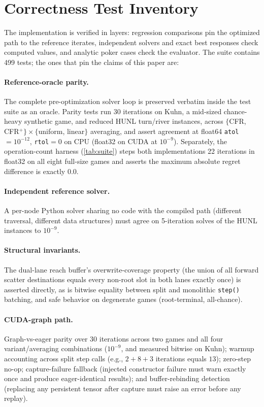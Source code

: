 \section{Correctness Test Inventory}
\label{app:correctness}

The implementation is verified in layers: regression comparisons pin the optimized
path to the reference iterates, independent solvers and exact best responses check
computed values, and analytic poker cases check the evaluator. The suite contains
499 tests; the ones that pin the claims of this paper are:

\paragraph{Reference-oracle parity.}
The complete pre-optimization solver loop is preserved verbatim inside the test suite
as an oracle. Parity tests run 30 iterations on Kuhn, a mid-sized chance-heavy
synthetic game, and reduced HUNL turn/river instances, across
$\{$CFR, CFR$^{+}\} \times \{$uniform, linear$\}$ averaging, and assert agreement at
float64 \texttt{atol}$=10^{-12}$, \texttt{rtol}$=0$ on CPU (float32 on CUDA at
$10^{-9}$). Separately, the operation-count harness (\cref{tab:suite}) steps both
implementations 22 iterations in float32 on all eight full-size games and asserts the
maximum absolute regret difference is exactly $0.0$.

\paragraph{Independent reference solver.}
A per-node Python solver sharing no code with the compiled path (different traversal,
different data structures) must agree on 5-iteration solves of the HUNL instances to
$10^{-9}$.

\paragraph{Structural invariants.}
The dual-lane reach buffer's overwrite-coverage property (the union of all forward
scatter destinations equals every non-root slot in both lanes exactly once) is
asserted directly, as is bitwise equality between split and monolithic
\texttt{step()} batching, and safe behavior on degenerate games (root-terminal,
all-chance).

\paragraph{CUDA-graph path.}
Graph-vs-eager parity over 30 iterations across two games and all four
variant/averaging combinations ($10^{-9}$, and measured bitwise on Kuhn); warmup
accounting across split step calls (e.g., $2+8+3$ iterations equals $13$); zero-step
no-op; capture-failure fallback (injected constructor failure must warn exactly once
and produce eager-identical results); and buffer-rebinding detection (replacing any
persistent tensor after capture must raise an error before any replay).

